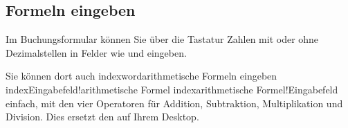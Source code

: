 \subsection{Formeln eingeben\label{transactions-new-numbers}}

Im Buchungsformular können Sie über die Tastatur Zahlen mit oder ohne Dezimalstellen in Felder wie  und  eingeben.

Sie können dort auch indexword{arithmetische Formeln} eingeben index{Eingabefeld!arithmetische Formel} index{arithmetische Formel!Eingabefeld} einfach, mit den vier Operatoren für Addition, Subtraktion, Multiplikation und Division. Dies ersetzt den  auf Ihrem Desktop.

